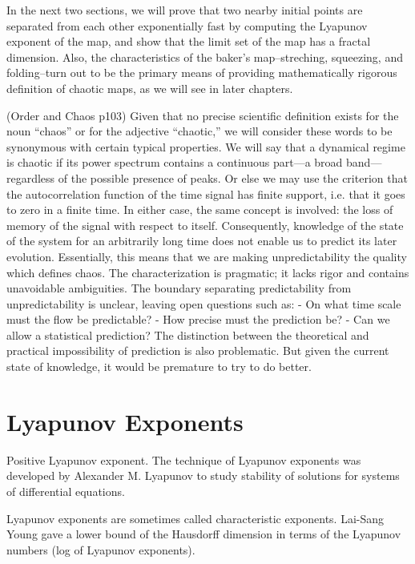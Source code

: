 \documentclass[12pt,twoside]{book}
\begin{document}
In the next two sections, we will prove that two nearby initial points are separated from each other exponentially fast by computing the Lyapunov exponent of the map, and show that the limit set of the map has a fractal dimension.
Also, the characteristics of the baker's map--streching, squeezing, and folding--turn out to be the primary means of providing mathematically rigorous definition of chaotic maps, as we will see in later chapters.

(Order and Chaos p103)
Given that no precise scientific definition exists for the noun ``chaos'' or for the adjective ``chaotic,'' we will consider these words to be synonymous with certain typical properties.
We will say that a dynamical regime is chaotic if its power spectrum contains a continuous part---a broad band---regardless of the possible presence of peaks.
Or else we may use the criterion that the autocorrelation function of the time signal has finite support, i.e. that it goes to zero in a finite time.
In either case, the same concept is involved: the loss of memory of the signal with respect to itself.
Consequently, knowledge of the state of the system for an arbitrarily long time does not enable us to predict its later evolution.
Essentially, this means that we are making unpredictability the quality which defines chaos.
The characterization is pragmatic; it lacks rigor and contains unavoidable ambiguities.
The boundary separating predictability from unpredictability is unclear, leaving open questions such as:
- On what time scale must the flow be predictable?
- How precise must the prediction be?
- Can we allow a statistical prediction?
The distinction between the theoretical and practical impossibility of prediction is also problematic.
But given the current state of knowledge, it would be premature to try to do better.

\section{Lyapunov Exponents}
Positive Lyapunov exponent.\citet{kantz-schreiber} 
The technique of Lyapunov exponents was developed by Alexander M. Lyapunov to study stability of solutions for systems of differential equations.

Lyapunov exponents are sometimes called characteristic exponents.
Lai-Sang Young gave a lower bound of the Hausdorff dimension in terms of the Lyapunov numbers (log of Lyapunov exponents).
\end{document}
